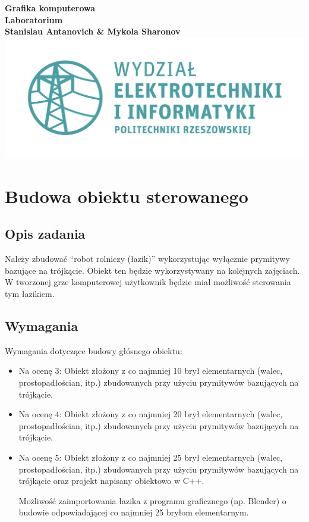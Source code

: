 \documentclass[a4paper, 12pt]{report}
\begin{document}
\begin{titlepage}
\begin{center}
		\vspace*{1cm}
		\textbf{Grafika komputerowa\\Laboratorium\\}
		\vspace{2cm}
		\textbf{Stanislau Antanovich \& Mykola Sharonov}
		\vfill
		\vspace{0.8cm}
		\includegraphics[scale=0.7]{logo.png}
\end{center}
\end{titlepage}

\tableofcontents
\newpage

\chapter{Budowa obiektu sterowanego}
\section{Opis zadania}
Należy zbudować ``robot rolniczy (łazik)'' wykorzystując wyłącznie prymitywy bazujące na trójkącie. Obiekt ten będzie wykorzystywany na kolejnych zajęciach. W tworzonej grze komputerowej użytkownik będzie miał możliwość sterowania tym łazikiem.
\section{Wymagania}
Wymagania dotyczące budowy głósnego obiektu:
\begin{itemize}
\item Na ocenę 3: Obiekt złożony z co najmniej 10 brył elementarnych (walec, prostopadłościan, itp.) zbudowanych przy użyciu prymitywów bazujących na trójkącie.
\item Na ocenę 4: Obiekt złożony z co najmniej 20 brył elementarnych (walec, prostopadłościan, itp.) zbudowanych przy użyciu prymitywów bazujących na trójkącie.
\item Na ocenę 5: Obiekt złożony z co najmniej 25 brył elementarnych (walec, prostopadłościan, itp.) zbudowanych przy użyciu prymitywów bazujących na trójkącie oraz projekt napisany obiektowo w C++.

Możliwość zaimportowania łazika z programu graficznego (np. Blender) o budowie odpowiadającej co najmniej 25 bryłom elementarnym.
\end{itemize}
\end{document}
